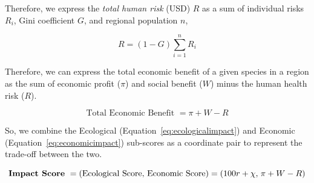 Therefore, we express the \textit{total human risk} (USD) \(R\) as a sum of individual risks \(R_i\), Gini coefficient \(G\), and regional population \(n\),

\begin{equation}
    R = (1 - G) \sum_{i=1}^n R_i 
\end{equation}

Therefore, we can express the total economic benefit of a given species in a region as the sum of economic profit (\(\pi\)) and social benefit (\(W\)) minus the human health risk (\(R\)).

\begin{equation}
    \text{Total Economic Benefit } = \pi + W - R
    \label{eq:economicimpact}
\end{equation}

So, we combine the Ecological (Equation~\ref{eq:ecologicalimpact}) and Economic (Equation~\ref{eq:economicimpact}) sub-scores as a coordinate pair to represent the trade-off between the two.

\begin{equation}
    \text{\textbf{Impact Score} } = (\text{Ecological Score, Economic Score}) = (100r + \chi, \hspace{0.05cm} \pi + W - R)
\end{equation}
